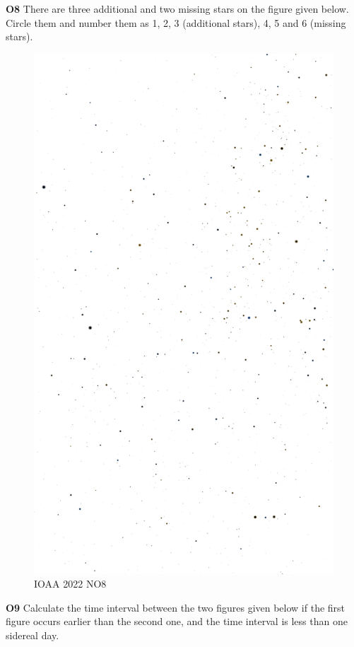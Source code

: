 \documentclass[a4paper,12pt]{extarticle}
\begin{document}
\textbf{O8} There are three additional and two missing stars on the figure given below. Circle them and number them as 1, 2, 3 (additional stars), 4, 5 and 6 (missing stars). 
\begin{figure}[H]
	\centering
	\includegraphics[width=0.8\linewidth]{ioaa22_3.png}
	\caption{IOAA 2022 NO8}
\end{figure}
\textbf{O9} Calculate the time interval between the two figures given below if the first figure occurs earlier than the second one, and the time interval is less than one sidereal day.
\end{document}
